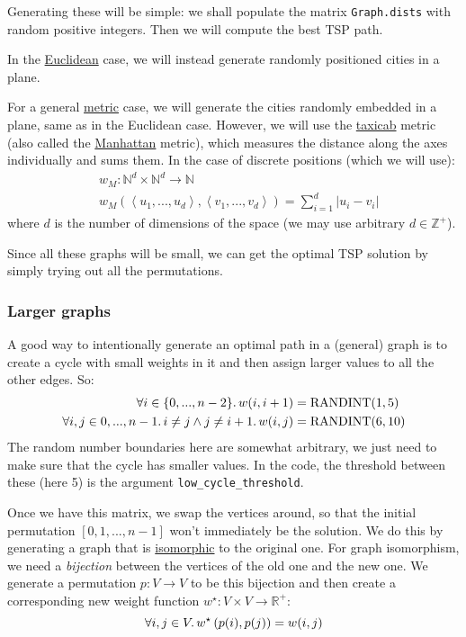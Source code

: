\documentclass{article}
\newcommand{\randint}{\operatorname{RANDINT}}
\newcommand{\uu}[1]{\underline{#1}}
\newcommand{\ii}[1]{\textit{#1}}
\newcommand{\py}[1]{\lstinline[language=Python]{#1}}
\begin{document}
Generating these will be simple: we shall populate the matrix
\py{Graph.dists} with random positive integers. Then we will
compute the best TSP path.

In the \uu{Euclidean} case, we will instead generate randomly positioned
cities in a plane.

For a general \uu{metric} case, we will generate the cities randomly embedded
in a plane, same as in the Euclidean case. However, we will use
the \uu{taxicab} metric (also called the \uu{Manhattan} metric), which measures
the distance along the axes individually and sums them. In the case of discrete
positions (which we will use):
\begin{align*}
  & w_M: \mathbb{N}^d \times \mathbb{N}^d \to \mathbb{N} \\
  & w_M\left(\left<u_1,...,u_d\right>, \left<v_1,...,v_d\right>\right) = \sum_{i=1}^d \left|u_i - v_i\right|
\end{align*}
where $d$ is the number of dimensions of the space (we may use arbitrary
$d\in\mathbb{Z}^{+}$).

Since all these graphs will be small, we can get the optimal TSP solution by
simply trying out all the permutations.

\subsubsection{Larger graphs}

A good way to intentionally generate an optimal path in a (general) graph is to create
a cycle with small weights in it and then assign larger values to all the other
edges. So:
\begin{align*}\forall i\in\{0,...,n-2\}\ldotp w(i,i+1) & =\randint(1,5)\\
  \forall i,j\in{0,...,n-1}\ldotp i\ne j \wedge j\ne i+1 \ldotp
  w(i,j) & = \randint(6,10) \\
\end{align*}
The random number boundaries here are somewhat arbitrary, we just need to make
sure that the cycle has smaller values. In the code, the threshold between these
(here 5) is the argument \py{low_cycle_threshold}.

Once we have this matrix, we swap the vertices around, so that the initial
permutation $[0,1,...,n-1]$ won't immediately be the solution. We do this by
generating a graph that is \uu{isomorphic} to the original one. For graph isomorphism,
we need a \ii{bijection} between the vertices of the old one and the new one. We
generate a permutation $p:V\to V$ to be this bijection and then create a corresponding
new weight function $w^\star:V\times V \to \mathbb{R}^{+}$:
\[ \forall i,j\in V \ldotp
  w^\star\left( p(i), p(j) \right)
  = w(i,j) \]
\end{document}
